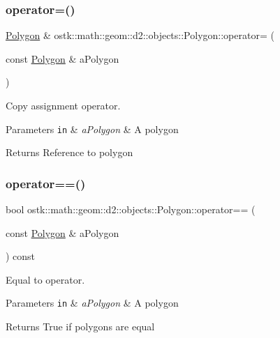 \subsubsection{\texorpdfstring{operator=()}{operator=()}}
{\footnotesize\ttfamily \hyperlink{classostk_1_1math_1_1geom_1_1d2_1_1objects_1_1_polygon}{Polygon} \& ostk\+::math\+::geom\+::d2\+::objects\+::\+Polygon\+::operator= (\begin{DoxyParamCaption}\item[{const \hyperlink{classostk_1_1math_1_1geom_1_1d2_1_1objects_1_1_polygon}{Polygon} \&}]{a\+Polygon }\end{DoxyParamCaption})}



Copy assignment operator. 


\begin{DoxyParams}[1]{Parameters}
\mbox{\tt in}  & {\em a\+Polygon} & A polygon \\
\hline
\end{DoxyParams}
\begin{DoxyReturn}{Returns}
Reference to polygon 
\end{DoxyReturn}
\mbox{\label{classostk_1_1math_1_1geom_1_1d2_1_1objects_1_1_polygon_a6fa3a2d3811523250bbb916e5d0ff8b9}} 
\subsubsection{\texorpdfstring{operator==()}{operator==()}}
{\footnotesize\ttfamily bool ostk\+::math\+::geom\+::d2\+::objects\+::\+Polygon\+::operator== (\begin{DoxyParamCaption}\item[{const \hyperlink{classostk_1_1math_1_1geom_1_1d2_1_1objects_1_1_polygon}{Polygon} \&}]{a\+Polygon }\end{DoxyParamCaption}) const}



Equal to operator. 


\begin{DoxyParams}[1]{Parameters}
\mbox{\tt in}  & {\em a\+Polygon} & A polygon \\
\hline
\end{DoxyParams}
\begin{DoxyReturn}{Returns}
True if polygons are equal 
\end{DoxyReturn}
\mbox{\label{classostk_1_1math_1_1geom_1_1d2_1_1objects_1_1_polygon_adbf6ed9930a6dd2f3eab1c5c1b256ded}} 
